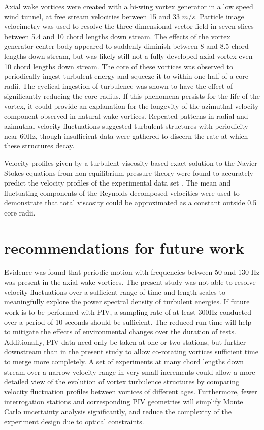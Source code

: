 
Axial wake vortices were created with a bi-wing vortex generator in a low speed 
wind tunnel, at free stream velocities between 15 and 33 $m/s$. Particle image 
velocimetry was used to resolve the three dimensional vector field in seven 
slices between 5.4 and 10 chord lengths down stream. The effects of the vortex 
generator center body appeared to suddenly diminish between 8 and 8.5 chord 
lengths down stream, but was likely still not a fully developed axial vortex 
even 10 chord lengths down stream. 
The core of these 
vortices was observed to periodically ingest turbulent energy and squeeze it to 
within one half of a core radii. The cyclical ingestion of turbulence was shown 
to have the effect of significantly reducing the core radius. If this phenomena 
persists for the life of the vortex, it could provide an explanation for the 
longevity of the azimuthal velocity component observed in natural wake 
vortices. Repeated patterns in radial and azimuthal velocity fluctuations 
suggested turbulent structures with periodicity near 60Hz, though insufficient 
data were gathered to discern the rate at which these structures decay.

Velocity profiles given by a turbulent viscosity based exact solution to the 
Navier Stokes equations
from non-equilibrium pressure theory were found to accurately predict 
the velocity profiles of the experimental data set \cite{ash2011}. The mean and 
fluctuating components of the Reynolds decomposed velocities were used to 
demonstrate that total viscosity could be approximated as a constant 
outside 0.5 core radii. 

\newpage
\section{recommendations for future work}
Evidence was found that periodic motion with frequencies between 50 and 130 Hz 
was present in the axial wake vortices. The present study was not able to 
resolve velocity fluctuations over a sufficient range of time and length scales 
to meaningfully explore the power spectral density of turbulent energies. If 
future work is to be performed with PIV, a sampling rate of at least 300Hz 
conducted over a period of 10 seconds should be sufficient. The reduced run 
time will help to mitigate the effects of environmental changes over the 
duration of tests. Additionally, PIV 
data need only be taken at one or two stations, but further downstream than in 
the present study to allow co-rotating vortices sufficient time to merge more 
completely. A set of experiments at many chord lengths down stream over a 
narrow 
velocity range in very small increments could allow a 
more detailed view of the evolution of vortex turbulence structures by 
comparing velocity fluctuation profiles between vortices of different ages. 
Furthermore, fewer interrogation stations and corresponding PIV geometries will 
simplify Monte Carlo uncertainty analysis significantly, and reduce the 
complexity of the experiment design due to optical constraints.

